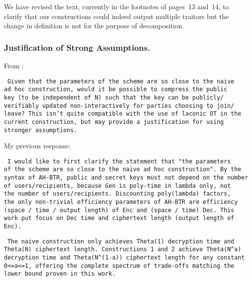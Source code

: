 We have revised the text,
currently in the footnotes of pages~13 and~14,
to clarify that our constructions could indeed output multiple traitors
but the change in definition is not for the purpose of decomposition.

\subsubsection{Justification of Strong Assumptions.}
From :

\texttt{
Given that the parameters of the scheme are so close to the naive \\
ad hoc construction, would it be possible to compress the public \\
key (to be independent of N) such that the key can be publicly/\\
verifiably updated non-interactively for parties choosing to join/\\
leave? This isn't quite compatible with the use of laconic OT in the \\
current construction, but may provide a justification for using \\
stronger assumptions.
}

My previous response:

\texttt{
I would like to first clarify the statement that "the parameters \\
of the scheme are so close to the naive ad hoc construction". By the \\
syntax of AH-BTR, public and secret keys must not depend on the number \\
of users/recipients, because Gen is poly-time in lambda only, not \\
the number of users/recipients. Discounting poly(lambda) factors, \\
the only non-trivial efficiency parameters of AH-BTR are efficiency \\
(space / time / output length) of Enc and (space / time) Dec. This \\
work put focus on Dec time and ciphertext length (output length of \\
Enc).
}

\texttt{
The naive construction only achieves Theta(1) decryption time and \\
Theta(N) ciphertext length. Constructions 1 and 2 achieve Theta(N{\string^}a) \\
decryption time and Theta(N{\string^}(1-a)) ciphertext length for any constant \\
0<=a<=1, offering the complete spectrum of trade-offs matching the \\
lower bound proven in this work.
}

